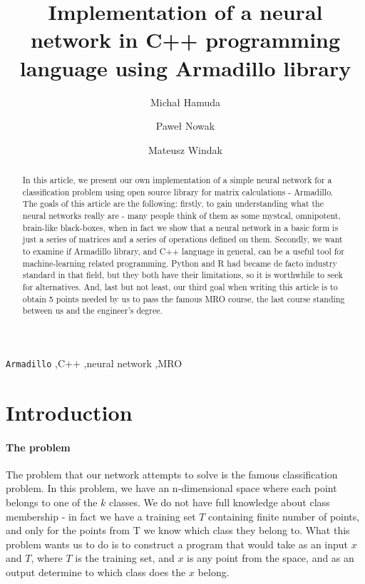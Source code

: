 \documentclass[3p,twocolumn]{elsarticle}
\begin{document}
\begin{frontmatter}

\title{Implementation of a neural network in C++ programming language using Armadillo library}

\author{Michał Hamuda}


\author{Paweł Nowak}

\author{Mateusz Windak}



\begin{abstract}
In this article, we present our own implementation of a simple neural network for a classification problem using open source library for matrix calculations - Armadillo. The goals of this article are the following: firstly, to gain understanding what the neural networks really are - many people think of them as some mystcal, omnipotent, brain-like black-boxes, when in fact we show that a neural network in a basic form is just a series of matrices and a series of operations defined on them. Secondly, we want to examine if Armadillo library, and C++ language in general, can be a useful tool for machine-learning related programming. Python and R had became de facto industry standard in that field, but they both have their limitations, so it is worthwhile to seek for alternatives. And, last but not least, our third goal when writing this article is to obtain 5 points needed by us to pass the famous MRO course, the last course standing between us and the engineer's degree.
\end{abstract}

\begin{keyword}
\texttt{Armadillo} \sep C++ \sep neural network \sep MRO
\end{keyword}

\end{frontmatter}


\section{Introduction}

\paragraph{The problem} 
The problem that our network attempts to solve is the famous classification problem. In this problem, we have an n-dimensional space where each point belongs to one of the $k$ classes. We do not have full knowledge about class membership - in fact we have a training set $T$ containing finite number of points, and only for the points from T we know which class they belong to. What this problem wants us to do is to construct a program that would take as an input $x$ and $T$, where $T$ is the training set, and $x$ is any point from the space, and as an output determine to which class does the $x$ belong.
\end{document}
